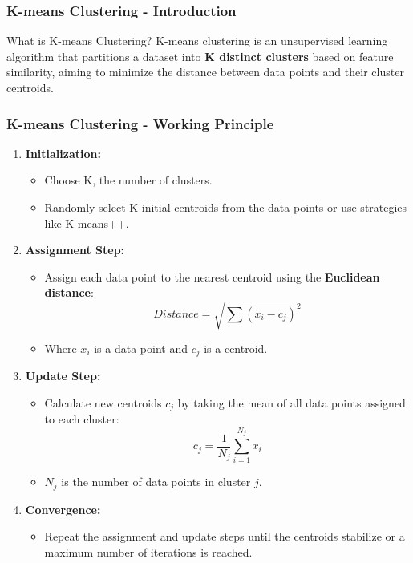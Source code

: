 \documentclass[aspectratio=169]{beamer}
\begin{document}
\begin{frame}[fragile]
    \frametitle{K-means Clustering - Introduction}
    \begin{block}{What is K-means Clustering?}
        K-means clustering is an unsupervised learning algorithm that partitions a dataset into \textbf{K distinct clusters} based on feature similarity, aiming to minimize the distance between data points and their cluster centroids.
    \end{block}
\end{frame}

\begin{frame}[fragile]
    \frametitle{K-means Clustering - Working Principle}
    \begin{enumerate}
        \item \textbf{Initialization:}
        \begin{itemize}
            \item Choose K, the number of clusters.
            \item Randomly select K initial centroids from the data points or use strategies like K-means++.
        \end{itemize}
        
        \item \textbf{Assignment Step:}
        \begin{itemize}
            \item Assign each data point to the nearest centroid using the \textbf{Euclidean distance}:
            \begin{equation}
            Distance = \sqrt{\sum (x_i - c_j)^2}
            \end{equation}
            \item Where \(x_i\) is a data point and \(c_j\) is a centroid.
        \end{itemize}
        
        \item \textbf{Update Step:}
        \begin{itemize}
            \item Calculate new centroids \(c_j\) by taking the mean of all data points assigned to each cluster:
            \begin{equation}
            c_j = \frac{1}{N_j} \sum_{i=1}^{N_j} x_i
            \end{equation}
            \item \(N_j\) is the number of data points in cluster \(j\).
        \end{itemize}
        
        \item \textbf{Convergence:}
        \begin{itemize}
            \item Repeat the assignment and update steps until the centroids stabilize or a maximum number of iterations is reached.
        \end{itemize}
    \end{enumerate}
\end{frame}
\end{document}
